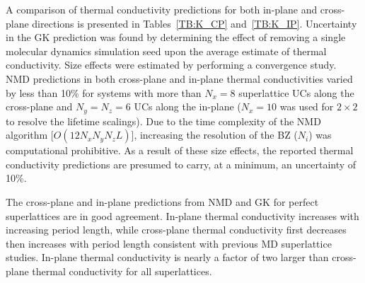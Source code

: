 \documentclass[aps,prb,preprint,preprintnumbers,amsmath,amssymb,floatfix,superscriptaddress]{revtex4}
\begin{document}
A comparison of thermal conductivity predictions for both in-plane and cross-plane directions is presented in Tables~\ref{TB:K_CP} and~\ref{TB:K_IP}. Uncertainty in the GK prediction was found by determining the effect of removing a single molecular dynamics simulation seed upon the average estimate of thermal conductivity. Size effects were estimated by performing a convergence study. NMD predictions in both cross-plane and in-plane thermal conductivities varied by less than 10\% for systems with more than $N_x=8$ superlattice UCs along the cross-plane and $N_y=N_z=6$ UCs along the in-plane ($N_x=10$ was used for $2\times2$ to resolve the lifetime scalings). Due to the time complexity of the NMD algorithm [$O(12N_x  N_y N_z L)$], increasing the resolution of the BZ ($N_i$) was computational prohibitive. As a result of these size effects, the reported thermal conductivity predictions are presumed to carry, at a minimum, an uncertainty of 10\%.

The cross-plane and in-plane predictions from NMD and GK for perfect superlattices are in good agreement. In-plane thermal conductivity increases with increasing period length, while cross-plane thermal conductivity first decreases then increases with period length consistent with previous MD superlattice studies. \cite {PhysRevB.72.174302} In-plane thermal conductivity is nearly a factor of two larger than cross-plane thermal conductivity for all superlattices.
\end{document}

